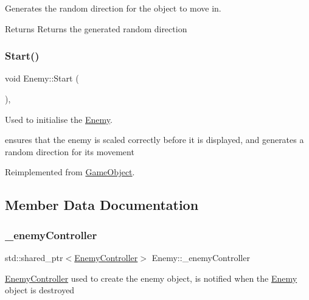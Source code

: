 Generates the random direction for the object to move in. 

\begin{DoxyReturn}{Returns}
Returns the generated random direction 
\end{DoxyReturn}
\mbox{\label{class_enemy_a64ee0cc6fb8a3424d486537efb8205d8}} 
\subsubsection{\texorpdfstring{Start()}{Start()}}
{\footnotesize\ttfamily void Enemy\+::\+Start (\begin{DoxyParamCaption}{ }\end{DoxyParamCaption})\hspace{0.3cm}{\ttfamily [override]}, {\ttfamily [virtual]}}



Used to initialise the \hyperlink{class_enemy}{Enemy}. 

ensures that the enemy is scaled correctly before it is displayed, and generates a random direction for its movement 

Reimplemented from \hyperlink{class_game_object_aeeb2162f2779e5591a372a1568bc5c68}{Game\+Object}.



\subsection{Member Data Documentation}
\mbox{\label{class_enemy_acc360bdd3b46cea29891f534af2153c8}} 
\subsubsection{\texorpdfstring{\+\_\+enemy\+Controller}{\_enemyController}}
{\footnotesize\ttfamily std\+::shared\+\_\+ptr$<$\hyperlink{class_enemy_controller}{Enemy\+Controller}$>$ Enemy\+::\+\_\+enemy\+Controller\hspace{0.3cm}{\ttfamily [private]}}

\hyperlink{class_enemy_controller}{Enemy\+Controller} used to create the enemy object, is notified when the \hyperlink{class_enemy}{Enemy} object is destroyed \mbox{\label{class_enemy_aab1e06a64c7fc2d07d40522a7a7cf8be}} 

